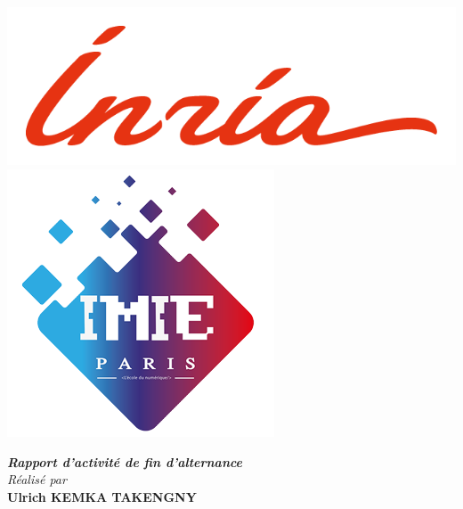 \documentclass[a4paper, oneside, 12pt, final]{extreport}
\title{\reportSubject}
\author{\reportAuthor}
\newcommand{\reportTitle} {
  \textsc{Projet de Fin d'\'etudes}
}
\newcommand{\reportAuthor} {
  \textbf{Ulrich KEMKA TAKENGNY}
}
\begin{document}
\thispagestyle{empty}
\begin{titlepage}
  \begin{center}


    \includegraphics[scale=0.7]{./images/inr_logo_rouge.png}
    \hfill
    \includegraphics[scale=0.4]{./images/logonoir.png}

    \vspace{3cm}






    \textbf{\textit{Rapport d'activité de fin d'alternance}}\\

    \vspace{5pt}
    {\textit{Réalisé par}}\\
    \vspace{10pt} {%
      \fontsize{14pt}{14pt}\selectfont
      {\bfseries\Large\sc \reportAuthor}\\
    }


\end{center}
\end{titlepage}
\end{document}
